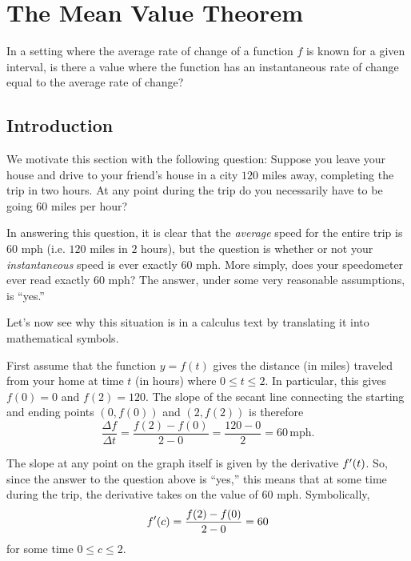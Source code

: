 \section{The Mean Value Theorem}\label{S:3.5.MeanValue}

\begin{goals}
\item In a setting where the average rate of change of a function $f$ is known for a given interval, is there a value where the function has an instantaneous rate of change equal to the average rate of change? 
\end{goals} 

\subsection*{Introduction}

We motivate this section with the following question: Suppose you leave your house and drive to your friend's house in a city $120$ miles away, completing the trip in two hours.  At any point during the trip do you necessarily have to be going $60$ miles per hour?

In answering this question, it is clear that the \textit{average} speed for the entire trip is $60$ mph (i.e. $120$ miles in $2$ hours), but the question is whether or not your \textit{instantaneous} speed is ever exactly $60$ mph. More simply, does your speedometer ever read exactly $60$ mph?  The answer, under some very reasonable assumptions, is ``yes.''

Let's now see why this situation is in a calculus text by translating it into mathematical symbols.

First assume that the function $y = f(t)$ gives the distance (in miles) traveled from your home at time $t$ (in hours) where $0\le t\le 2$.  In particular, this gives $f(0)=0$ and $f(2)=120$.  The slope of the secant line connecting the starting and ending points $(0,f(0))$ and $(2,f(2))$ is therefore 
$$
\frac{\Delta f}{\Delta t} = \frac{f(2)-f(0)}{2-0} = \frac{120-0}{2} = 60 \, \text{mph}.
$$

The slope at any point on the graph itself is given by the derivative $f'(t)$.  So, since the answer to the question above is ``yes,'' this means that at some time during the trip, the derivative takes on the value of $60$ mph.  Symbolically, 
$$
f'(c) = \frac{f(2)-f(0)}{2-0} = 60
$$
for some time $0\le c \le 2.$ 

